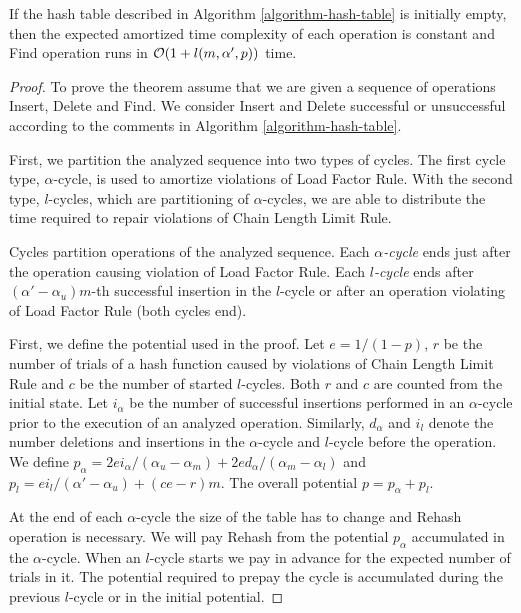 \begin{theorem}
\label{theorem-amortised-expected-time}
If the hash table described in Algorithm \ref{algorithm-hash-table} is initially empty, then the expected amortized time complexity of each operation is constant and Find operation runs in $\mathcal{O}(1 + l(m, \alpha', p))$ time.
\end{theorem}
\begin{proof}
To prove the theorem assume that we are given a sequence of operations Insert, Delete and Find. 
We consider Insert and Delete successful or unsuccessful according to the comments in Algorithm \ref{algorithm-hash-table}.

First, we partition the analyzed sequence into two types of cycles. 
The first cycle type, $\alpha$-cycle, is used to amortize violations of Load Factor Rule. 
With the second type, $l$-cycles, which are partitioning of $\alpha$-cycles, we are able to distribute the time required to repair violations of Chain Length Limit Rule.

\begin{definition}
Cycles partition operations of the analyzed sequence.
Each \emph{$\alpha$-cycle} ends just after the operation causing violation of Load Factor Rule.
Each \emph{$l$-cycle} ends after $(\alpha'-\alpha_u)m$-th successful insertion in the $l$-cycle or after an operation violating of Load Factor Rule (both cycles end).
\end{definition}

First, we define the potential used in the proof.
Let $e = 1/(1 - p)$, $r$ be the number of trials of a hash function caused by violations of Chain Length Limit Rule and $c$ be the number of started $l$-cycles.
Both $r$ and $c$ are counted from the initial state.
Let $i_\alpha$ be the number of successful insertions performed in an $\alpha$-cycle prior to the execution of an analyzed operation.
Similarly, $d_\alpha$ and $i_l$ denote the number deletions and insertions in the $\alpha$-cycle and $l$-cycle before the operation.
We define $p_\alpha = {2ei_{\alpha}}/{(\alpha_u - \alpha_m)} + {2ed_{\alpha}}/{(\alpha_m - \alpha_l)}$ and $p_l = {ei_{l}}/{(\alpha' - \alpha_u)} + (ce - r) m$.
The overall potential $p = p_\alpha + p_l$.

At the end of each $\alpha$-cycle the size of the table has to change and Rehash operation is necessary.
We will pay Rehash from the potential $p_\alpha$ accumulated in the $\alpha$-cycle.
When an $l$-cycle starts we pay in advance for the expected number of trials in it.
The potential required to prepay the cycle is accumulated during the previous $l$-cycle or in the initial potential.


\end{proof}
